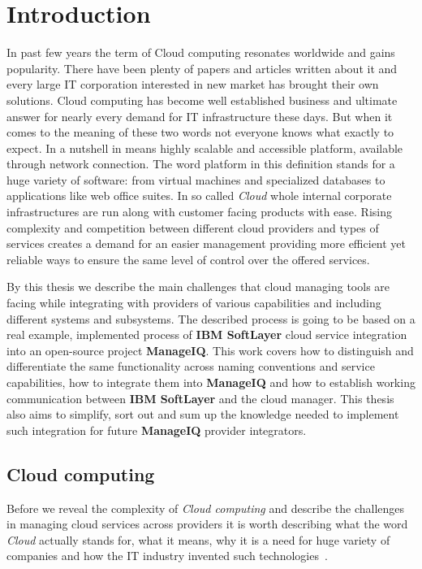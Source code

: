 
\chapter{Introduction}
\label{chap:Introduction}
In past few years the term of Cloud computing resonates worldwide and gains popularity. There have been plenty of papers and articles written about it and every large IT corporation interested in new market has brought their own solutions. Cloud computing has become well established business and ultimate answer for nearly every demand for IT infrastructure these days. But when it comes to the meaning of these two words not everyone knows what exactly to expect. In a nutshell in means highly scalable and accessible platform, available through network connection. The word platform in this definition stands for a huge variety of software: from virtual machines and specialized databases to applications like web office suites. In so called \emph{Cloud} whole internal corporate infrastructures are run along with customer facing products with ease. Rising complexity and competition between different cloud providers and types of services creates a demand for an easier management providing more efficient yet reliable ways to ensure the same level of control over the offered services.

By this thesis we describe the main challenges that cloud managing tools are facing while integrating with providers of various capabilities and including different systems and subsystems. The described process is going to be based on a real example, implemented process of \textbf{IBM SoftLayer} cloud service integration into an open-source project \textbf{ManageIQ}. This work covers how to distinguish and differentiate the same functionality across naming conventions and service capabilities, how to integrate them into \textbf{ManageIQ} and how to establish working communication between \textbf{IBM SoftLayer} and the cloud manager. This thesis also aims to simplify, sort out and sum up the knowledge needed to implement such integration for future \textbf{ManageIQ} provider integrators.

\section{Cloud computing}
\label{sec:Cloud computing}
Before we reveal the complexity of \emph{Cloud computing} and describe the challenges in managing cloud services across providers it is worth describing what the word \emph{Cloud} actually stands for, what it means, why it is a need for huge variety of companies and how the IT industry invented such technologies~\cite{cervone}.

